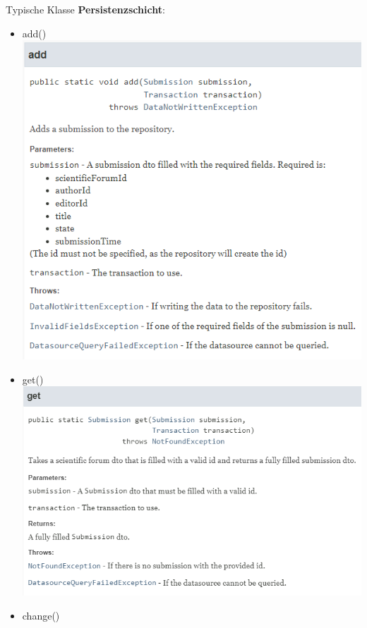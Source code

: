 \documentclass{beamer}
\begin{document}
\begin{frame}{Typische Klasse \textbf{Persistenzschicht}:}
\begin{itemize}
            \item add()
            \centering
            \includegraphics[height=1.1\textheight]{graphics/repo/doc_add}
            \item get()
            \centering
            \includegraphics[height=1.1\textheight]{graphics/repo/doc_get}
            \item change()
            \centering

\end{itemize}
\end{frame}
\end{document}
